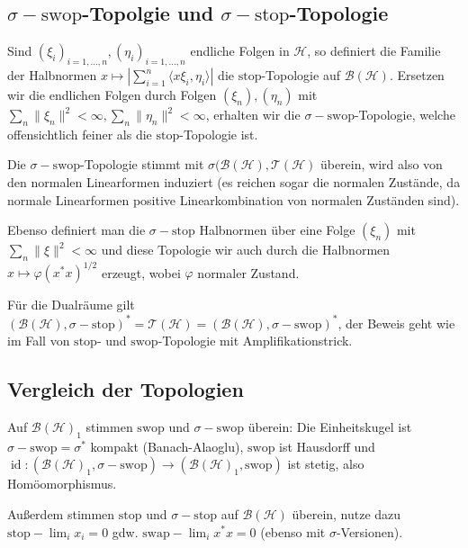 \documentclass[11pt,a4paper]{scrartcl}
\newcommand{\Hc}{\mathcal{H}}
\newcommand{\B}{\mathcal{B}}
\newcommand{\T}{\mathcal{T}}
\theoremstyle{plain}
\theoremstyle{definition}
\theoremstyle{remark}
\DeclareMathOperator{\id}{id}
\begin{document}
\subsection{$\sigma-\mathrm{swop}$-Topolgie und $\sigma-\mathrm{stop}$-Topologie}

Sind $(\xi_i)_{i=1,\dots,n},(\eta_i)_{i=1,\dots,n}$ endliche Folgen in $\Hc$, so definiert die Familie der Halbnormen $x\mapsto |\sum_{i=1}^n \langle x\xi_i, \eta_i \rangle|$ die $\mathrm{stop}$-Topologie auf $\B(\Hc)$. Ersetzen wir die endlichen Folgen durch Folgen $(\xi_n),(\eta_n)$ mit $\sum_n \|\xi_n\|^2 < \infty, \sum_n \|\eta_n\|^2 < \infty$, erhalten wir die $\sigma-\mathrm{swop}$-Topologie, welche offensichtlich feiner als die $\mathrm{stop}$-Topologie ist.

Die $\sigma-\mathrm{swop}$-Topologie stimmt mit $\sigma(\B(\Hc),\T(\Hc)$ überein, wird also von den normalen Linearformen induziert (es reichen sogar die normalen Zustände, da normale Linearformen positive Linearkombination von normalen Zuständen sind).

Ebenso definiert man die $\sigma-\mathrm{stop}$ Halbnormen über eine Folge $(\xi_n)$ mit $\sum_n \|\xi\|^2 < \infty$ und diese Topologie wir auch durch die Halbnormen $x\mapsto \varphi(x^*x)^{1/2}$ erzeugt, wobei $\varphi$ normaler Zustand.

Für die Dualräume gilt $(\B(\Hc),\sigma-\mathrm{stop})^*=\T(\Hc)=(\B(\Hc),\sigma-\mathrm{swop})^*$, der Beweis geht wie im Fall von $\mathrm{stop}$- und $\mathrm{swop}$-Topologie mit Amplifikationstrick.

\subsection{Vergleich der Topologien}

Auf $\B(\Hc)_1$ stimmen $\mathrm{swop}$ und $\sigma-\mathrm{swop}$ überein: Die Einheitskugel ist $\sigma-\mathrm{swop}=\sigma^*$ kompakt (Banach-Alaoglu), $\mathrm{swop}$ ist Hausdorff und $\id: (\B(\Hc)_1, \sigma-\mathrm{swop})\to (\B(\Hc)_1,\mathrm{swop})$ ist stetig, also Homöomorphismus.

Außerdem stimmen $\mathrm{stop}$ und $\sigma-\mathrm{stop}$ auf $\B(\Hc)$ überein, nutze dazu $\mathrm{stop}-\lim_i x_i = 0$ gdw. $\mathrm{swap}-\lim_i x^*x = 0$ (ebenso mit $\sigma$-Versionen).
\end{document}
